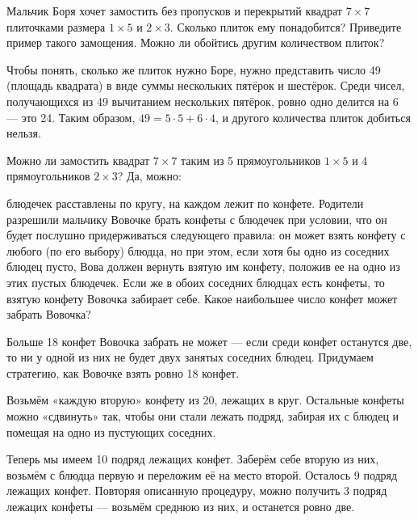 \begin{itemize}
	\itC Мальчик Боря хочет замостить без пропусков и перекрытий квадрат $7\times 7$ плиточками размера $1\times 5$ и $2\times 3.$ Сколько плиток ему понадобится? Приведите пример такого замощения.  Можно ли обойтись другим количеством плиток?
	
	Чтобы понять, сколько же плиток нужно Боре, нужно представить число 49 (площадь квадрата) в виде суммы нескольких пятёрок и шестёрок. Среди чисел, получающихся из 49 вычитанием нескольких пятёрок, ровно одно делится на 6 — это 24. Таким образом, $49 = 5 \cdot 5 + 6 \cdot 4$, и другого количества плиток добиться нельзя.
	
	Можно ли замостить квадрат $7 \times 7$ таким из 5 прямоугольников $1 \times 5$ и 4 прямоугольников $2 \times 3$? Да, можно:
	
	\begin{center}  \end{center}
	
\end{itemize}


\begin{itemize}

	\itA {}
	
	 блюдечек расставлены по кругу, на каждом лежит по конфете. Родители разрешили мальчику Вовочке брать конфеты с блюдечек при условии, что он будет послушно придерживаться следующего правила: он может взять конфету с любого (по его выбору) блюдца, но при этом, если хотя бы одно из соседних блюдец пусто, Вова должен вернуть взятую им конфету, положив ее на одно из этих пустых блюдечек. Если же в обоих соседних блюдцах есть конфеты, то взятую конфету Вовочка забирает себе. Какое наибольшее число конфет может забрать Вовочка?
	
	\itr Больше 18 конфет Вовочка забрать не может — если среди конфет останутся две, то ни у одной из них не будет двух занятых соседних блюдец. Придумаем стратегию, как Вовочке взять ровно 18 конфет.
	
	Возьмём «каждую вторую» конфету из 20, лежащих в круг. Остальные конфеты можно «сдвинуть» так, чтобы они стали лежать подряд, забирая их с блюдец и помещая на одно из пустующих соседних.
	
	Теперь мы имеем 10 подряд лежащих конфет. Заберём себе вторую из них, возьмём с блюдца первую и переложим её на место второй. Осталось 9 подряд лежащих конфет. Повторяя описанную процедуру, можно получить 3 подряд лежацих конфеты — возьмём среднюю из них, и останется ровно две.

\end{itemize}